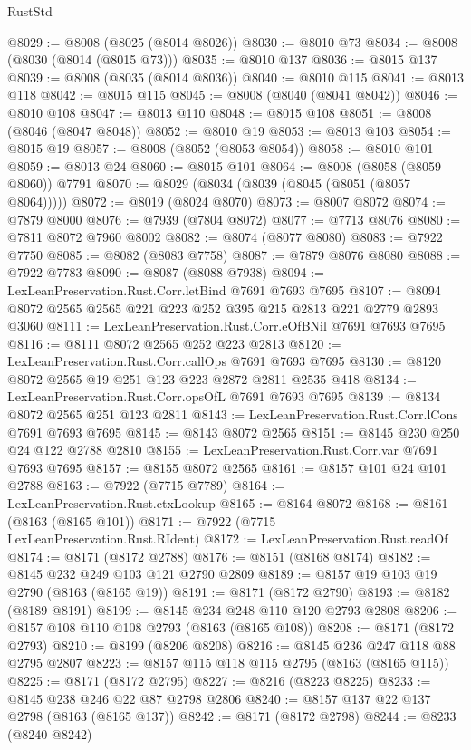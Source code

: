 \begin{lexlean}{RustStd}
\begin{coremodule}
@8029 := @8008 (@8025 (@8014 @8026))
@8030 := @8010 @73
@8034 := @8008 (@8030 (@8014 (@8015 @73)))
@8035 := @8010 @137
@8036 := @8015 @137
@8039 := @8008 (@8035 (@8014 @8036))
@8040 := @8010 @115
@8041 := @8013 @118
@8042 := @8015 @115
@8045 := @8008 (@8040 (@8041 @8042))
@8046 := @8010 @108
@8047 := @8013 @110
@8048 := @8015 @108
@8051 := @8008 (@8046 (@8047 @8048))
@8052 := @8010 @19
@8053 := @8013 @103
@8054 := @8015 @19
@8057 := @8008 (@8052 (@8053 @8054))
@8058 := @8010 @101
@8059 := @8013 @24
@8060 := @8015 @101
@8064 := @8008 (@8058 (@8059 @8060)) @7791
@8070 := @8029 (@8034 (@8039 (@8045 (@8051 (@8057 @8064)))))
@8072 := @8019 (@8024 @8070)
@8073 := @8007 @8072
@8074 := @7879 @8000
@8076 := @7939 (@7804 @8072)
@8077 := @7713 @8076
@8080 := @7811 @8072 @7960 @8002
@8082 := @8074 (@8077 @8080)
@8083 := @7922 @7750
@8085 := @8082 (@8083 @7758)
@8087 := @7879 @8076 @8080
@8088 := @7922 @7783
@8090 := @8087 (@8088 @7938)
@8094 := LexLeanPreservation.Rust.Corr.letBind @7691 @7693 @7695
@8107 := @8094 @8072 @2565 @2565 @221 @223 @252 @395 @215 @2813 @221 @2779 @2893 @3060
@8111 := LexLeanPreservation.Rust.Corr.eOfBNil @7691 @7693 @7695
@8116 := @8111 @8072 @2565 @252 @223 @2813
@8120 := LexLeanPreservation.Rust.Corr.callOps @7691 @7693 @7695
@8130 := @8120 @8072 @2565 @19 @251 @123 @223 @2872 @2811 @2535 @418
@8134 := LexLeanPreservation.Rust.Corr.opsOfL @7691 @7693 @7695
@8139 := @8134 @8072 @2565 @251 @123 @2811
@8143 := LexLeanPreservation.Rust.Corr.lCons @7691 @7693 @7695
@8145 := @8143 @8072 @2565
@8151 := @8145 @230 @250 @24 @122 @2788 @2810
@8155 := LexLeanPreservation.Rust.Corr.var @7691 @7693 @7695
@8157 := @8155 @8072 @2565
@8161 := @8157 @101 @24 @101 @2788
@8163 := @7922 (@7715 @7789)
@8164 := LexLeanPreservation.Rust.ctxLookup
@8165 := @8164 @8072
@8168 := @8161 (@8163 (@8165 @101))
@8171 := @7922 (@7715 LexLeanPreservation.Rust.RIdent)
@8172 := LexLeanPreservation.Rust.readOf
@8174 := @8171 (@8172 @2788)
@8176 := @8151 (@8168 @8174)
@8182 := @8145 @232 @249 @103 @121 @2790 @2809
@8189 := @8157 @19 @103 @19 @2790 (@8163 (@8165 @19))
@8191 := @8171 (@8172 @2790)
@8193 := @8182 (@8189 @8191)
@8199 := @8145 @234 @248 @110 @120 @2793 @2808
@8206 := @8157 @108 @110 @108 @2793 (@8163 (@8165 @108))
@8208 := @8171 (@8172 @2793)
@8210 := @8199 (@8206 @8208)
@8216 := @8145 @236 @247 @118 @88 @2795 @2807
@8223 := @8157 @115 @118 @115 @2795 (@8163 (@8165 @115))
@8225 := @8171 (@8172 @2795)
@8227 := @8216 (@8223 @8225)
@8233 := @8145 @238 @246 @22 @87 @2798 @2806
@8240 := @8157 @137 @22 @137 @2798 (@8163 (@8165 @137))
@8242 := @8171 (@8172 @2798)
@8244 := @8233 (@8240 @8242)

\end{coremodule}
\end{lexlean}
